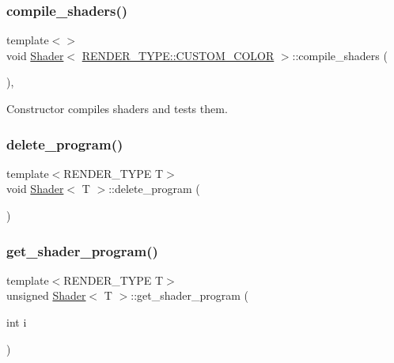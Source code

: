 \subsubsection{\texorpdfstring{compile\+\_\+shaders()}{compile\_shaders()}\hspace{0.1cm}{\footnotesize\ttfamily [6/6]}}
{\footnotesize\ttfamily template$<$$>$ \\
void \mbox{\hyperlink{classShader}{Shader}}$<$ \mbox{\hyperlink{shader__class_8hpp_a24e288e18eb7b6e01de7565001fedb60a9d34355b5a26c54b5dbab1e45245a6f4}{R\+E\+N\+D\+E\+R\+\_\+\+T\+Y\+P\+E\+::\+C\+U\+S\+T\+O\+M\+\_\+\+C\+O\+L\+OR}} $>$\+::compile\+\_\+shaders (\begin{DoxyParamCaption}{ }\end{DoxyParamCaption})\hspace{0.3cm}{\ttfamily [inline]}, {\ttfamily [protected]}}



Constructor compiles shaders and tests them. 

\mbox{\label{classShader_aaa9a1f01655e7b8de1f57c9b5d4d0724}} 
\subsubsection{\texorpdfstring{delete\+\_\+program()}{delete\_program()}}
{\footnotesize\ttfamily template$<$R\+E\+N\+D\+E\+R\+\_\+\+T\+Y\+PE T$>$ \\
void \mbox{\hyperlink{classShader}{Shader}}$<$ T $>$\+::delete\+\_\+program (\begin{DoxyParamCaption}{ }\end{DoxyParamCaption})\hspace{0.3cm}{\ttfamily [inline]}}

\mbox{\label{classShader_a2c19b216850480109f9d5f7ed6ab6aa6}} 
\subsubsection{\texorpdfstring{get\+\_\+shader\+\_\+program()}{get\_shader\_program()}\hspace{0.1cm}{\footnotesize\ttfamily [1/2]}}
{\footnotesize\ttfamily template$<$R\+E\+N\+D\+E\+R\+\_\+\+T\+Y\+PE T$>$ \\
unsigned \mbox{\hyperlink{classShader}{Shader}}$<$ T $>$\+::get\+\_\+shader\+\_\+program (\begin{DoxyParamCaption}\item[{int}]{i }\end{DoxyParamCaption})\hspace{0.3cm}{\ttfamily [inline]}}

